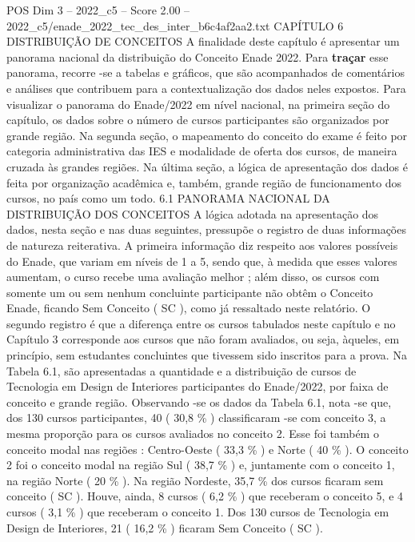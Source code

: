 \begin{textsample}{POS Dim 3 – 2022\_c5 – Score 2.00 – 2022\_c5/enade\_2022\_tec\_des\_inter\_b6c4af2aa2.txt}  \label{ex:f3_pos_066}
CAPÍTULO 6 DISTRIBUIÇÃO DE CONCEITOS A finalidade deste capítulo é apresentar um panorama nacional da distribuição do Conceito Enade 2022.
Para \textbf{traçar} esse panorama, recorre -se a tabelas e gráficos, que são acompanhados de comentários e análises que contribuem para a contextualização dos dados neles expostos.
Para visualizar o panorama do Enade/2022 em nível nacional, na primeira seção do capítulo, os dados sobre o número de cursos participantes são organizados por grande região.
Na segunda seção, o mapeamento do conceito do exame é feito por categoria administrativa das IES e modalidade de oferta dos cursos, de maneira cruzada às grandes regiões.
Na última seção, a lógica de apresentação dos dados é feita por organização acadêmica e, também, grande região de funcionamento dos cursos, no país como um todo. 6.1 PANORAMA NACIONAL DA DISTRIBUIÇÃO DOS CONCEITOS A lógica adotada na apresentação dos dados, nesta seção e nas duas seguintes, pressupõe o registro de duas informações de natureza reiterativa.
A primeira informação diz respeito aos valores possíveis do Enade, que variam em níveis de 1 a 5, sendo que, à medida que esses valores aumentam, o curso recebe uma avaliação melhor ; além disso, os cursos com somente um ou sem nenhum concluinte participante não obtêm o Conceito Enade, ficando Sem Conceito ( SC ), como já ressaltado neste relatório.
O segundo registro é que a diferença entre os cursos tabulados neste capítulo e no Capítulo 3 corresponde aos cursos que não foram avaliados, ou seja, àqueles, em princípio, sem estudantes concluintes que tivessem sido inscritos para a prova.
Na Tabela 6.1, são apresentadas a quantidade e a distribuição de cursos de Tecnologia em Design de Interiores participantes do Enade/2022, por faixa de conceito e grande região.
Observando -se os dados da Tabela 6.1, nota -se que, dos 130 cursos participantes, 40 ( 30,8 \% ) classificaram -se com conceito 3, a mesma proporção para os cursos avaliados no conceito 2.
Esse foi também o conceito modal nas regiões : Centro-Oeste ( 33,3 \% ) e Norte ( 40 \% ).
O conceito 2 foi o conceito modal na região Sul ( 38,7 \% ) e, juntamente com o conceito 1, na região Norte ( 20 \% ).
Na região Nordeste, 35,7 \% dos cursos ficaram sem conceito ( SC ).
Houve, ainda, 8 cursos ( 6,2 \% ) que receberam o conceito 5, e 4 cursos ( 3,1 \% ) que receberam o conceito 1.
Dos 130 cursos de Tecnologia em Design de Interiores, 21 ( 16,2 \% ) ficaram Sem Conceito ( SC ).

\end{textsample}
